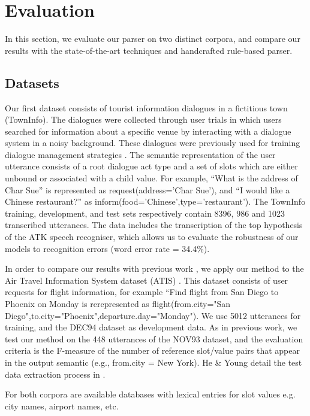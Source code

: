 \documentclass[11pt]{article}
\begin{document}
\section{Evaluation} \label{sec:evaluation}

In this section, we evaluate our parser on two distinct corpora, and compare our results with the state-of-the-art techniques and handcrafted rule-based parser. 

\subsection{Datasets}

Our first dataset consists of tourist information dialogues in a fictitious
town (TownInfo). The dialogues were collected through user
trials in which users searched for information about a specific venue
by interacting with a dialogue system in a noisy background. These
dialogues were previously used for training dialogue management
strategies \cite{williams07,thomson08}. The semantic representation of the user utterance consists of a root dialogue act type and a set of slots which are either
unbound or associated with a child value. For example, ``What is
the address of Char Sue'' is represented as request(address='Char Sue'), and ``I would like a Chinese restaurant?'' as inform(food='Chinese',type='restaurant'). The TownInfo training, development, and test sets respectively contain
8396, 986 and 1023 transcribed utterances.  The data includes the transcription of the top hypothesis of the ATK speech recogniser,
which allows us to evaluate the robustness of our models to recognition
errors (word error rate = 34.4\%). 

In order to compare our results with previous work \cite{he06,zettlemoyer07},
we apply our method to the Air Travel Information System dataset
(ATIS) \cite{atis94}. This dataset consists of user requests for flight information, for example ``Find flight from San Diego to Phoenix on Monday is rerepresented as flight(from.city="San Diego",to.city="Phoenix",departure.day="Monday"). We use 5012 utterances for training, and the DEC94 dataset as development data. As in previous work, we test our method on the 448 utterances of the NOV93 dataset, and the evaluation criteria is the F-measure of the number of reference slot/value pairs that appear in the output semantic (e.g., from.city = New York). He \& Young detail the test data extraction process in \cite{he05}.

For both corpora are available databases with lexical entries for slot values e.g. city names, airport names, etc. 
\end{document}
